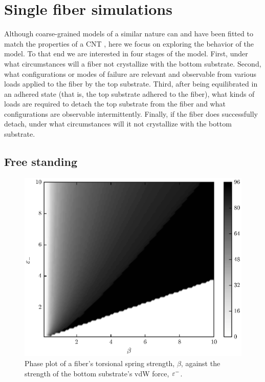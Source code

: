\chapter{Single fiber simulations} \label{chap:three}

Although coarse-grained models of a similar nature can and have been fitted to match the properties of a CNT \cite{Cranford2010}, here we focus on exploring the behavior of the model. To that end we are interested in four stages of the model. First, under what circumstances will a fiber not crystallize with the bottom substrate. Second, what configurations or modes of failure are relevant and observable from various loads applied to the fiber by the top substrate. Third, after being equilibrated in an adhered state (that is, the top substrate adhered to the fiber), what kinds of loads are required to detach the top substrate from the fiber and what configurations are observable intermittently. Finally, if the fiber does successfully detach, under what circumstances will it not crystallize with the bottom substrate.

\section{Free standing}

	\begin{figure}[t]
		\begin{center}
			\includegraphics{./fig/ch3/fs/grid.eps}
		\end{center}		
		\caption{Phase plot of a fiber's torsional spring strength, $\beta$, against the strength of the bottom substrate's vdW force, $\varepsilon^-$.
		\label{fig:FreeStandingGrid}}
	\end{figure}	

